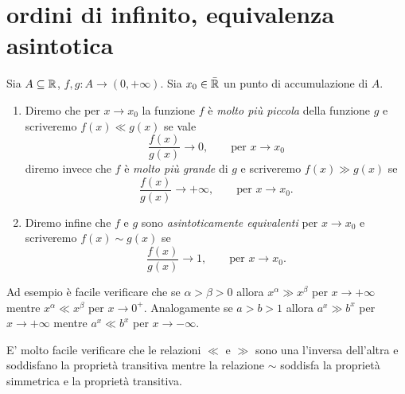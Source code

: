\section{ordini di infinito, equivalenza asintotica}

\begin{definition}%
  \label{def:ordine_infinito}%
  \mymark{***}%
%
  Sia $A\subseteq {\mathbb R}$, $f,g\colon A \to (0,+\infty)$.
  Sia $x_0\in \bar {{\mathbb R}}$ un punto di accumulazione di $A$.
  \begin{enumerate}
  \item
  Diremo che
  per $x\to x_0$ la funzione $f$ è \emph{molto più piccola}
  della funzione $g$ e scriveremo $f(x) \ll g(x)$ se vale
  \mymargin{$\ll$}%
\index{$\ll$}
  \[
  \frac{f(x)}{g(x)} \to 0, \qquad \text{per $x\to x_0$}
  \]
  diremo invece che $f$ è \emph{molto più grande}
  di $g$ e scriveremo $f(x) \gg g(x)$ se
  \mymargin{$\gg$}%
\index{$\gg$}
  \[
  \frac{f(x)}{g(x)} \to +\infty, \qquad \text{per $x\to x_0$.}
  \]
  \item
  Diremo infine che $f$ e $g$
  sono \emph{asintoticamente equivalenti}%
%
%
  per $x\to x_0$
  e scriveremo $f(x) \sim g(x)$ se
  \mymargin{$\sim$}%
\index{$\sim$}
  \[
  \frac{f(x)}{g(x)} \to 1, \qquad \text{per $x\to x_0.$}
  \]
  \end{enumerate}
\end{definition}
  
Ad esempio è facile verificare che se $\alpha > \beta > 0$
allora $x^\alpha \gg x^\beta$ per $x\to +\infty$
mentre $x^\alpha \ll x^\beta$ per $x\to 0^+$.
Analogamente se $a>b>1$ allora $a^x\gg b^x$ per $x\to +\infty$
mentre $a^x \ll b^x$ per $x\to -\infty$.

E' molto facile verificare che le relazioni
$\ll$ e $\gg$ sono una l'inversa dell'altra
e soddisfano la proprietà transitiva
mentre la relazione $\sim$ soddisfa la proprietà simmetrica
e la proprietà transitiva.

